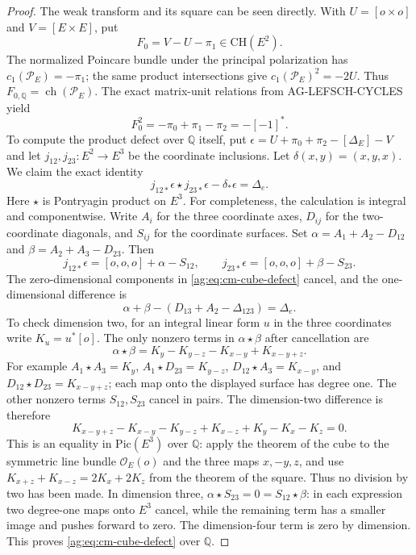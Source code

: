 \begin{proof}
The weak transform and its square can be seen directly.
With $U=[o\times o]$ and $V=[E\times E]$, put
\[
 F_0=V-U-\pi_1\in\mathrm{CH}(E^2).
\]
The normalized Poincare bundle under the principal
polarization has $c_1(\mathcal P_E)=-\pi_1$;
the same product intersections give
$c_1(\mathcal P_E)^2=-2U$.
Thus $F_{0,\mathbb Q}=\operatorname{ch}(\mathcal P_E)$.
The exact matrix-unit relations from AG-LEFSCH-CYCLES
yield
\[
 F_0^2=-\pi_0+\pi_1-\pi_2=-[-1]^*.
\]
To compute the product defect over $\mathbb Q$ itself,
put $\epsilon=U+\pi_0+\pi_2-[\Delta_E]-V$ and let
$j_{12},j_{23}:E^2\to E^3$ be the coordinate inclusions.
Let $\delta(x,y)=(x,y,x)$.  We claim the exact identity
\begin{equation}
 j_{12*}\epsilon\star j_{23*}\epsilon-\delta_*\epsilon
       =\Delta_e.                                      \label{ag:eq:cm-cube-defect}
\end{equation}
Here $\star$ is Pontryagin product on $E^3$.
For completeness, the calculation is integral and
componentwise.  Write $A_i$ for the three coordinate
axes, $D_{ij}$ for the two-coordinate diagonals, and
$S_{ij}$ for the coordinate surfaces.  Set
$\alpha=A_1+A_2-D_{12}$ and
$\beta=A_2+A_3-D_{23}$.  Then
\[
 j_{12*}\epsilon=[o,o,o]+\alpha-S_{12},\qquad
 j_{23*}\epsilon=[o,o,o]+\beta-S_{23}.
\]
The zero-dimensional components in \eqref{ag:eq:cm-cube-defect}
cancel, and the one-dimensional difference is
\[
 \alpha+\beta-(D_{13}+A_2-\Delta_{123})=\Delta_e.
\]
To check dimension two, for an integral linear form
$u$ in the three coordinates write $K_u=u^*[o]$.
The only nonzero terms in $\alpha\star\beta$ after
cancellation are
\[
 \alpha\star\beta=K_y-K_{y-z}-K_{x-y}+K_{x-y+z}.
\]
For example $A_1\star A_3=K_y$,
$A_1\star D_{23}=K_{y-z}$,
$D_{12}\star A_3=K_{x-y}$, and
$D_{12}\star D_{23}=K_{x-y+z}$; each map onto
the displayed surface has degree one.  The other
nonzero terms $S_{12},S_{23}$ cancel in pairs.
The dimension-two difference is therefore
\[
 K_{x-y+z}-K_{x-y}-K_{y-z}+K_{x-z}+K_y-K_x-K_z=0.
\]
This is an equality in $\mathrm{Pic}(E^3)$ over
$\mathbb Q$: apply the theorem of the cube to the
symmetric line bundle $\mathcal O_E(o)$ and the
three maps $x,-y,z$, and use
$K_{x+z}+K_{x-z}=2K_x+2K_z$ from the theorem of the
square.  Thus no division by two has been made.
In dimension three,
$\alpha\star S_{23}=0=S_{12}\star\beta$:
in each expression two degree-one maps onto $E^3$
cancel, while the remaining term has a smaller image
and pushes forward to zero.  The dimension-four
term is zero by dimension.  This proves
\eqref{ag:eq:cm-cube-defect} over $\mathbb Q$.


\end{proof}
